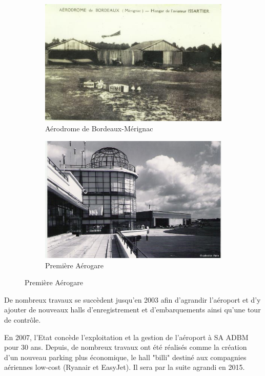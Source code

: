 \begin{figure}[hbt!]
    \begin{subfigure}{0.5\textwidth}
      \centering
      \includegraphics[width=.7\linewidth]{Images/premier.jpg}  
      \caption{Aérodrome de Bordeaux-Mérignac}
      \label{fig:aérodrome}
    \end{subfigure}
    \begin{subfigure}{0.5\textwidth}
      \centering
      \includegraphics[width=.7\linewidth]{Images/premiere_aerogare.jpg}  
      \caption{Première Aérogare}
      \label{fig:premiereAerogare}
    \end{subfigure}
\end{figure}
De nombreux travaux se succèdent jusqu'en 2003 afin d'agrandir l'aéroport et d'y ajouter de nouveaux halls d'enregistrement et d'embarquements ainsi qu'une tour de contrôle.

En 2007, l'Etat concède l'exploitation et la gestion de l'aéroport à SA ADBM pour 30 ans. Depuis, de nombreux travaux ont été réalisés comme la création d'un nouveau parking plus économique, le hall "billi" destiné aux compagnies aériennes low-cost (Ryanair et EasyJet). Il sera par la suite agrandi en 2015.\newline

